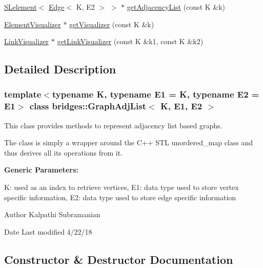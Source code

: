 \begin{DoxyCompactItemize}
\item 
\mbox{\hyperlink{classbridges_1_1_s_lelement}{S\+Lelement}}$<$ \mbox{\hyperlink{classbridges_1_1_edge}{Edge}}$<$ K, E2 $>$ $>$ $\ast$ \mbox{\hyperlink{classbridges_1_1_graph_adj_list_ab9eb791b7c242742ac832121f297acdc}{get\+Adjacency\+List}} (const K \&k)
\item 
\mbox{\hyperlink{classbridges_1_1_element_visualizer}{Element\+Visualizer}} $\ast$ \mbox{\hyperlink{classbridges_1_1_graph_adj_list_a1c2c773a13dbd1fddd55bc2642c08574}{get\+Visualizer}} (const K \&k)
\item 
\mbox{\hyperlink{classbridges_1_1_link_visualizer}{Link\+Visualizer}} $\ast$ \mbox{\hyperlink{classbridges_1_1_graph_adj_list_a6e065b1411388387ff1e4df9227ce480}{get\+Link\+Visualizer}} (const K \&k1, const K \&k2)
\end{DoxyCompactItemize}


\subsection{Detailed Description}
\subsubsection*{template$<$typename K, typename E1 = K, typename E2 = E1$>$\newline
class bridges\+::\+Graph\+Adj\+List$<$ K, E1, E2 $>$}

This class provides methods to represent adjacency list based graphs. 

The class is simply a wrapper around the C++ S\+TL unordered\+\_\+map class and thus derives all its operations from it.

{\bfseries Generic Parameters\+:} \begin{DoxyVerb}     K:  used as an index to retrieve vertices,
     E1: data type used to store vertex specific information,
     E2: data type used to store edge specific information
\end{DoxyVerb}


\begin{DoxyAuthor}{Author}
Kalpathi Subramanian 
\end{DoxyAuthor}
\begin{DoxyDate}{Date}
Last modified 4/22/18 
\end{DoxyDate}


\subsection{Constructor \& Destructor Documentation}
\mbox{\label{classbridges_1_1_graph_adj_list_af7acceab0f85c75de56cf2fc74b3690b}} 
